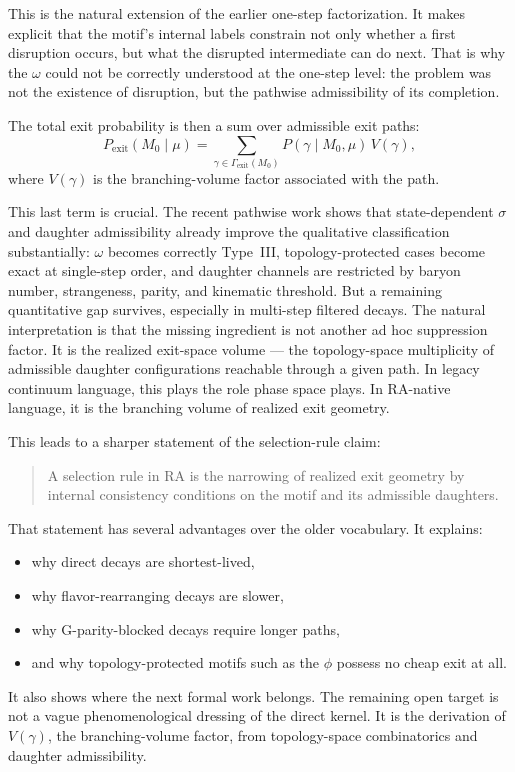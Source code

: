 \documentclass[11pt]{article}
\begin{document}
This is the natural extension of the earlier one-step factorization. It makes explicit that the motif's internal labels constrain not only whether a first disruption occurs, but what the disrupted intermediate can do next. That is why the $\omega$ could not be correctly understood at the one-step level: the problem was not the existence of disruption, but the pathwise admissibility of its completion.

The total exit probability is then a sum over admissible exit paths:
\[
P_{\mathrm{exit}}(M_0\mid\mu)
=
\sum_{\gamma\in\Gamma_{\mathrm{exit}}(M_0)}
P(\gamma\mid M_0,\mu)\,V(\gamma),
\]
where $V(\gamma)$ is the branching-volume factor associated with the path.

This last term is crucial. The recent pathwise work shows that state-dependent $\sigma$ and daughter admissibility already improve the qualitative classification substantially: $\omega$ becomes correctly Type~III, topology-protected cases become exact at single-step order, and daughter channels are restricted by baryon number, strangeness, parity, and kinematic threshold. But a remaining quantitative gap survives, especially in multi-step filtered decays. The natural interpretation is that the missing ingredient is not another ad hoc suppression factor. It is the realized exit-space volume --- the topology-space multiplicity of admissible daughter configurations reachable through a given path. In legacy continuum language, this plays the role phase space plays. In RA-native language, it is the branching volume of realized exit geometry.

This leads to a sharper statement of the selection-rule claim:
\begin{quote}
A selection rule in RA is the narrowing of realized exit geometry by internal consistency conditions on the motif and its admissible daughters.
\end{quote}

That statement has several advantages over the older vocabulary. It explains:
\begin{itemize}
    \item why direct decays are shortest-lived,
    \item why flavor-rearranging decays are slower,
    \item why G-parity-blocked decays require longer paths,
    \item and why topology-protected motifs such as the $\phi$ possess no cheap exit at all.
\end{itemize}
It also shows where the next formal work belongs. The remaining open target is not a vague phenomenological dressing of the direct kernel. It is the derivation of $V(\gamma)$, the branching-volume factor, from topology-space combinatorics and daughter admissibility.
\end{document}
